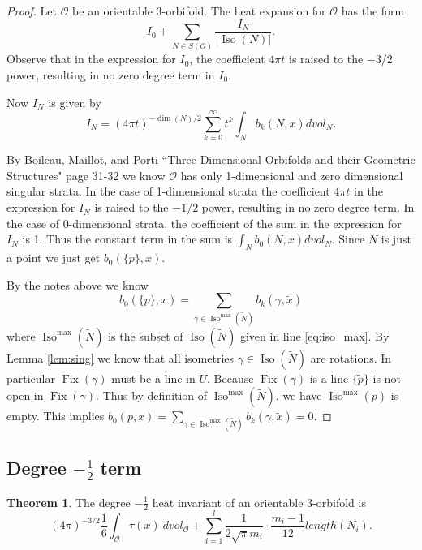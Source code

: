 \documentclass[12pt]{article}
\newcommand{\myabs}[1]{\vert#1\vert}
\theoremstyle{definition}
\newtheorem{theorem}{Theorem}[section]
\DeclareMathOperator{\iso}{Iso}
\DeclareMathOperator{\fix}{Fix}
\begin{document}
\begin{proof}
Let $\mathcal{O}$ be an orientable 3-orbifold. The heat expansion for $\mathcal{O}$ has the form
$$I_0+\sum_{N \in S(\mathcal{O})}\frac{I_N}{\myabs{\iso(N)}}.$$
Observe that in the expression for $I_0$, the coefficient $4\pi t$ is raised to the $-3/2$ power, resulting in no zero degree term in $I_0$.

Now $I_N$ is given by
$$I_N= {(4\pi t)}^{-\dim(N)/2}\sum_{k=0}^{\infty}t^k\int_{N}b_k(N,x)dvol_N.$$


By Boileau, Maillot, and Porti ``Three-Dimensional Orbifolds and their Geometric Structures" page 31-32 we know $\mathcal{O}$ has only 1-dimensional and zero dimensional singular strata.  In the case of 1-dimensional strata the coefficient $4 \pi t$ in the expression for $I_N$ is raised to the $-1/2$ power, resulting in no zero degree term.  In the case of 0-dimensional strata, the coefficient of the sum in the expression for $I_N$ is 1.  Thus the constant term in the sum is $\int_N b_0(N,x) dvol_N$.  Since $N$ is just a point we just get $b_0(\{p\},x)$.

By the notes above we know 
 $$b_0(\{p\},x) =\sum_{\gamma \in \iso^{\max}(\tilde{N})} b_k(\gamma,\tilde{x})$$
 where $\iso^{\max}(\tilde{N})$ is the subset of $\iso(\tilde{N})$ given in line \ref{eq:iso_max}.  By Lemma \ref{lem:sing} we know that all isometries $\gamma \in \iso(\tilde{N})$ are rotations.  In particular $\fix(\gamma)$ must be a line in $\tilde{U}$.  Because $\fix(\gamma)$ is a line $\{\tilde{p}\}$ is not open in $\fix(\gamma)$.  Thus by definition of $\iso^{\max}(\tilde{N})$, we have $\iso^{\max}(\tilde{p})$ is empty.  This implies $b_0(p,x)=\sum_{\gamma \in \iso^{\max}(\tilde{N})} b_k(\gamma,\tilde{x})=0$.
 \end{proof}

 \subsection{Degree $-\frac{1}{2}$ term}

 \begin{theorem}  The degree $-\frac{1}{2}$ heat invariant of an orientable $3$-orbifold is 
 $$ (4\pi)^{-3/2} \frac{1}{6}\int_{\mathcal{O}} \tau(x) \ dvol_{\mathcal O}+\sum_{i=1}^l \frac{1}{2\sqrt{\pi}m_i} \cdot \frac{m_i-1}{12} length(N_i).$$
 \end{theorem}
\end{document}
